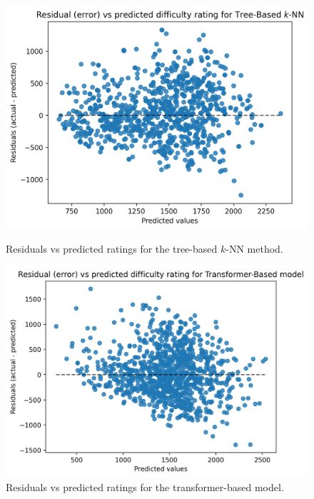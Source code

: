 \begin{figure}[H]
  \begin{minipage}{0.475\textwidth}
    \centering
    \includegraphics[width=\textwidth]{evaluation/img/tree_err.png}
    \caption{Residuals vs predicted ratings for the tree-based $k$-NN method.}
    \label{errTree}
  \end{minipage}
  \hspace{0.05\textwidth}
  \begin{minipage}{0.475\textwidth}
    \centering
    \includegraphics[width=\textwidth]{evaluation/img/transformer_err.png}
    \caption{Residuals vs predicted ratings for the transformer-based model.}
    \label{errTransformer}
  \end{minipage}
\end{figure}


